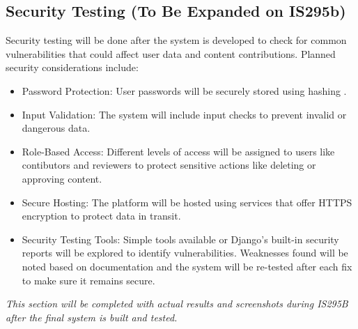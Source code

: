     \subsection{Security Testing (To Be Expanded on IS295b)}
        Security testing will be done after the system is developed to check for common vulnerabilities that could affect user data and content contributions. Planned security considerations include:
        \begin{itemize}
        \item Password Protection: User passwords will be securely stored using hashing .
        \item Input Validation: The system will include input checks to prevent invalid or dangerous data.
        \item Role-Based Access: Different levels of access will be assigned to users like contibutors and reviewers to protect sensitive actions like deleting or approving content.
        \item Secure Hosting: The platform will be hosted using services that offer HTTPS encryption to protect data in transit.
        \item Security Testing Tools: Simple tools available or Django’s built-in security reports will be explored to identify vulnerabilities. Weaknesses found will be noted based on documentation and the system will be re-tested after each fix to make sure it remains secure. 
    \end{itemize}
\textit{    This section will be completed with actual results and screenshots during IS295B after the final system is built and tested.}

